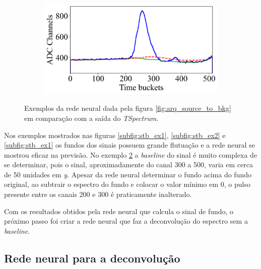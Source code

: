 \documentclass[a4paper,12pt,oneside]{book}
\begin{document}
\begin{figure}[H]
\begin{subfigure}[b]{0.49\textwidth}
        \caption{}
        \label{subfig:stb_ex3}
    \end{subfigure}%
    \hfill
    \begin{subfigure}[b]{0.46\textwidth}
        \centering
        \includegraphics[scale=0.43]{figs/stb_4.png}
        \caption{}
        \label{subfig:stb_ex4}
    \end{subfigure}
\caption{Exemplos da rede neural dada pela figura \ref{fig:arq_source_to_bkg} em comparação com a saída do \textit{TSpectrum}.}
\label{fig:stb_examples}
\end{figure}

\par Nos exemplos mostrados nas figuras \ref{subfig:stb_ex1}, \ref{subfig:stb_ex2} e \ref{subfig:stb_ex1} os fundos dos sinais possuem grande flutuação e a rede neural se mostrou eficaz na previsão. No exemplo \ref{subfig:stb_ex4} a \textit{baseline} do sinal é muito complexa de se determinar, pois o sinal, aproximadamente do canal 300 a 500, varia em cerca de 50 unidades em \textit{y}. Apesar da rede neural determinar o fundo acima do fundo original, ao subtrair o espectro do fundo e colocar o valor mínimo em 0, o pulso presente entre os canais 200 e 300 é praticamente inalterado.

\par Com os resultados obtidos pela rede neural que calcula o sinal de fundo, o próximo passo foi criar a rede neural que faz a deconvolução do espectro sem a \textit{baseline}.

\subsection{Rede neural para a deconvolução}\label{subsec:pulso_ml_deconv}

\end{document}
